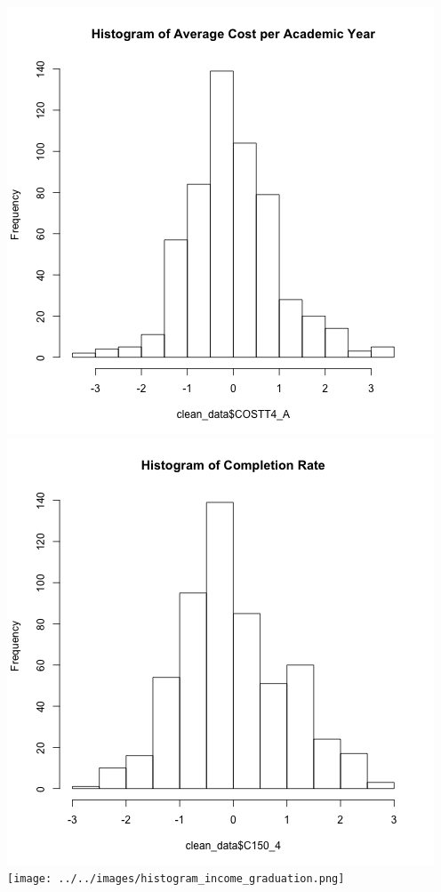 \includegraphics{../../images/histogram_net_price.png}
\includegraphics{../../images/histogram_completion.png}
\texttt{[image: ../../images/histogram\_income\_graduation.png]}
